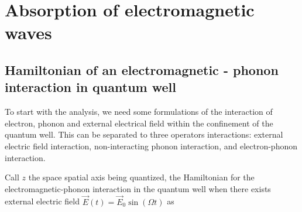 \documentclass{article}
\begin{document}
\section{Absorption of electromagnetic waves}

\subsection{Hamiltonian of an electromagnetic - phonon interaction in quantum well}

To start with the analysis, we need some formulations of the interaction of electron, phonon and external electrical field within the confinement of the quantum well. This can be separated to three operators interactions: external electric field interaction, non-interacting phonon interaction, and electron-phonon interaction. 

Call $z$ the space spatial axis being quantized, the Hamiltonian for the electromagnetic-phonon interaction in the quantum well when there exists external electric field $\vec{E}(t)=\vec{E}_{0}\sin{(\Omega t)}$ as 
\end{document}
